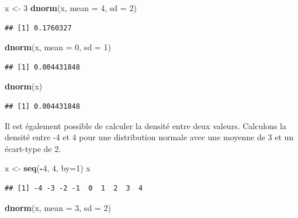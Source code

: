 \documentclass[
]{book}
\newenvironment{Shaded}{\begin{snugshade}}{\end{snugshade}}
\newcommand{\AttributeTok}[1]{\textcolor[rgb]{0.13,0.29,0.53}{#1}}
\newcommand{\DecValTok}[1]{\textcolor[rgb]{0.00,0.00,0.81}{#1}}
\newcommand{\FunctionTok}[1]{\textcolor[rgb]{0.13,0.29,0.53}{\textbf{#1}}}
\newcommand{\NormalTok}[1]{#1}
\newcommand{\OtherTok}[1]{\textcolor[rgb]{0.56,0.35,0.01}{#1}}
\newcommand{\SpecialCharTok}[1]{\textcolor[rgb]{0.81,0.36,0.00}{\textbf{#1}}}
\begin{document}
\begin{Shaded}
\begin{Highlighting}[]
\NormalTok{x }\OtherTok{\textless{}{-}} \DecValTok{3}
\FunctionTok{dnorm}\NormalTok{(x, }\AttributeTok{mean =} \DecValTok{4}\NormalTok{, }\AttributeTok{sd =} \DecValTok{2}\NormalTok{)}
\end{Highlighting}
\end{Shaded}

\begin{verbatim}
## [1] 0.1760327
\end{verbatim}

\begin{Shaded}
\begin{Highlighting}[]
\FunctionTok{dnorm}\NormalTok{(x, }\AttributeTok{mean =} \DecValTok{0}\NormalTok{, }\AttributeTok{sd =} \DecValTok{1}\NormalTok{)}
\end{Highlighting}
\end{Shaded}

\begin{verbatim}
## [1] 0.004431848
\end{verbatim}

\begin{Shaded}
\begin{Highlighting}[]
\FunctionTok{dnorm}\NormalTok{(x)}
\end{Highlighting}
\end{Shaded}

\begin{verbatim}
## [1] 0.004431848
\end{verbatim}

Il est également possible de calculer la densité entre deux valeurs. Calculons la densité entre -4 et 4 pour une distribution normale avec une moyenne de 3 et un écart-type de 2.

\begin{Shaded}
\begin{Highlighting}[]
\NormalTok{x }\OtherTok{\textless{}{-}} \FunctionTok{seq}\NormalTok{(}\SpecialCharTok{{-}}\DecValTok{4}\NormalTok{, }\DecValTok{4}\NormalTok{, }\AttributeTok{by=}\DecValTok{1}\NormalTok{)}
\NormalTok{x}
\end{Highlighting}
\end{Shaded}

\begin{verbatim}
## [1] -4 -3 -2 -1  0  1  2  3  4
\end{verbatim}

\begin{Shaded}
\begin{Highlighting}[]
\FunctionTok{dnorm}\NormalTok{(x, }\AttributeTok{mean =} \DecValTok{3}\NormalTok{, }\AttributeTok{sd =} \DecValTok{2}\NormalTok{)}
\end{Highlighting}
\end{Shaded}
\end{document}
